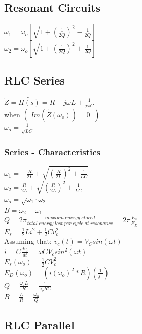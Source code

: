 \documentclass[a4paper,9pt]{extarticle}
\begin{document}
\begin{multicols*}{3}
{\section{Resonant Circuits }

$\omega_1 = \omega_o [ \sqrt{1+ (\frac{1}{2Q})^2 }- \frac{1}{2Q}] $ \\
$\omega_2 = \omega_o [ \sqrt{1+(\frac{1}{2Q})^2 }+ \frac{1}{2Q}] $ \\

\subsection{RLC Series}

$\tilde{Z} = \tilde{H(s)} = R + j \omega L + \frac{1}{j \omega C} $ \\
 when $(\;  Im(\tilde{Z}(\omega_o)) = 0 \;\;)$ \\
 $\omega_o = \frac{1}{\sqrt{LC}}$
    
\subsubsection{ Series - Characteristics } 
$\omega_1 = - \frac{R}{2L} + \sqrt{({\frac{R}{2L}})^2 + \frac{1}{LC}}$ \\
$\omega_2 = \frac{R}{2L} + \sqrt{({\frac{R}{2L}})^2 + \frac{1}{LC}}$ \\
$\omega_o = \sqrt{\omega_1 \cdot \omega_2}$ \\
$B = \omega_2 - \omega_1$ \\
$Q = 2 \pi \frac{ maxium \; energy \; stored}{total \; energy \; lost \; per\; cycle\; at\; resonance} = 2\pi \frac{E_s}{E_D}$ \\


$E_s = \frac{1}{2}L i^2 + \frac{1}{2}C v_c^2$ \\
Assuming that: $v_c(t) =  V_C sin(\omega t)$ \\
$i = C \frac{dv_c}{dt} = \omega C V_c sin^2(\omega t)$ \\
$E_s(\omega_o) = \frac{1}{2}C V_c^2$ \\
$E_D(\omega_o) = (i(\omega_o)^2 * R) (\frac{1}{f_o}) $ \\
$Q = \frac{\omega_o L}{R} = \frac{1}{\omega_o RC}$ \\
$B = \frac{L}{R} = \frac{\omega_o}{Q}$ 

\subsection{RLC Parallel}

}
\end{multicols*}
\end{document}
